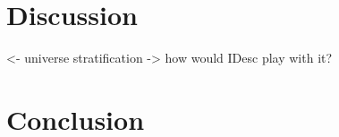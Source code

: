\documentclass[preprint, authoryear, onecolumn]{sigplanconf}
\newenvironment{structure}{\footnotesize\verbatim}{\endverbatim}
\begin{document}

\section{Discussion}

\begin{structure}
<- universe stratification
    -> how would IDesc play with it?
\end{structure}



\section{Conclusion}

\begin{structure}
\end{structure}















\end{document}
